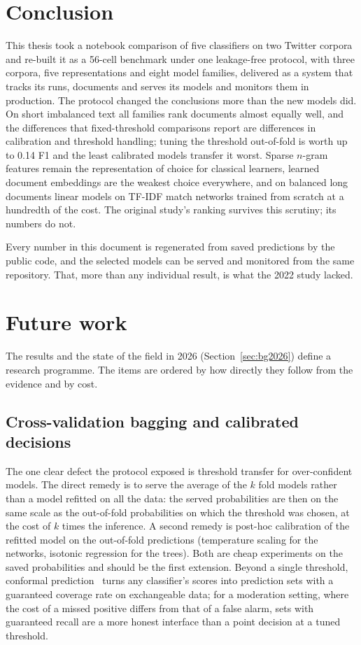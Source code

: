 \section{Conclusion}
This thesis took a notebook comparison of five classifiers on two Twitter corpora and re-built it as a 56-cell benchmark under one leakage-free protocol, with three corpora, five representations and eight model families, delivered as a system that tracks its runs, documents and serves its models and monitors them in production. The protocol changed the conclusions more than the new models did. On short imbalanced text all families rank documents almost equally well, and the differences that fixed-threshold comparisons report are differences in calibration and threshold handling; tuning the threshold out-of-fold is worth up to 0.14 F1 and the least calibrated models transfer it worst. Sparse $n$-gram features remain the representation of choice for classical learners, learned document embeddings are the weakest choice everywhere, and on balanced long documents linear models on TF-IDF match networks trained from scratch at a hundredth of the cost. The original study's ranking survives this scrutiny; its numbers do not.

Every number in this document is regenerated from saved predictions by the public code, and the selected models can be served and monitored from the same repository. That, more than any individual result, is what the 2022 study lacked.

\section{Future work}
The results and the state of the field in 2026 (Section~\ref{sec:bg2026}) define a research programme. The items are ordered by how directly they follow from the evidence and by cost.

\subsection{Cross-validation bagging and calibrated decisions}
The one clear defect the protocol exposed is threshold transfer for over-confident models. The direct remedy is to serve the average of the $k$ fold models rather than a model refitted on all the data: the served probabilities are then on the same scale as the out-of-fold probabilities on which the threshold was chosen, at the cost of $k$ times the inference. A second remedy is post-hoc calibration of the refitted model on the out-of-fold predictions (temperature scaling for the networks, isotonic regression for the trees). Both are cheap experiments on the saved probabilities and should be the first extension. Beyond a single threshold, conformal prediction~\cite{angelopoulos2023} turns any classifier's scores into prediction sets with a guaranteed coverage rate on exchangeable data; for a moderation setting, where the cost of a missed positive differs from that of a false alarm, sets with guaranteed recall are a more honest interface than a point decision at a tuned threshold.

